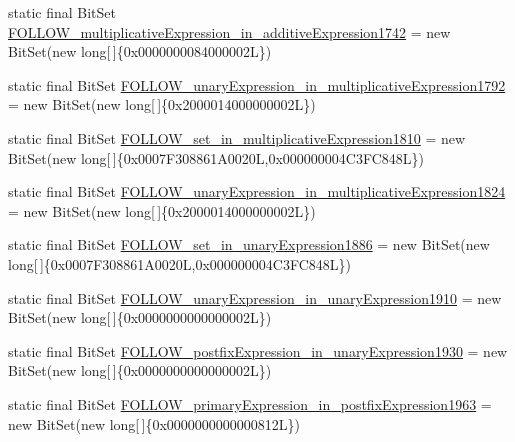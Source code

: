 \begin{DoxyCompactItemize}
\item 
static final Bit\-Set \hyperlink{classorg_1_1tzi_1_1use_1_1parser_1_1shell_1_1_shell_command_parser_afc497423bb8ad5b00ed5d5c4593c5d30}{F\-O\-L\-L\-O\-W\-\_\-multiplicative\-Expression\-\_\-in\-\_\-additive\-Expression1742} = new Bit\-Set(new long\mbox{[}$\,$\mbox{]}\{0x0000000084000002\-L\})
\item 
static final Bit\-Set \hyperlink{classorg_1_1tzi_1_1use_1_1parser_1_1shell_1_1_shell_command_parser_ac56334f9e533622073f94aa5b7e90cd4}{F\-O\-L\-L\-O\-W\-\_\-unary\-Expression\-\_\-in\-\_\-multiplicative\-Expression1792} = new Bit\-Set(new long\mbox{[}$\,$\mbox{]}\{0x2000014000000002\-L\})
\item 
static final Bit\-Set \hyperlink{classorg_1_1tzi_1_1use_1_1parser_1_1shell_1_1_shell_command_parser_a974a1b4dd61007a0cadacfffc5730efa}{F\-O\-L\-L\-O\-W\-\_\-set\-\_\-in\-\_\-multiplicative\-Expression1810} = new Bit\-Set(new long\mbox{[}$\,$\mbox{]}\{0x0007\-F308861\-A0020\-L,0x000000004\-C3\-F\-C848\-L\})
\item 
static final Bit\-Set \hyperlink{classorg_1_1tzi_1_1use_1_1parser_1_1shell_1_1_shell_command_parser_acdfca490e2653c7233faee3de2840437}{F\-O\-L\-L\-O\-W\-\_\-unary\-Expression\-\_\-in\-\_\-multiplicative\-Expression1824} = new Bit\-Set(new long\mbox{[}$\,$\mbox{]}\{0x2000014000000002\-L\})
\item 
static final Bit\-Set \hyperlink{classorg_1_1tzi_1_1use_1_1parser_1_1shell_1_1_shell_command_parser_ae3a39bf3fca69ad2fd3add8837b837df}{F\-O\-L\-L\-O\-W\-\_\-set\-\_\-in\-\_\-unary\-Expression1886} = new Bit\-Set(new long\mbox{[}$\,$\mbox{]}\{0x0007\-F308861\-A0020\-L,0x000000004\-C3\-F\-C848\-L\})
\item 
static final Bit\-Set \hyperlink{classorg_1_1tzi_1_1use_1_1parser_1_1shell_1_1_shell_command_parser_afd2110e0a7a7dd535f3e099d68b0be7a}{F\-O\-L\-L\-O\-W\-\_\-unary\-Expression\-\_\-in\-\_\-unary\-Expression1910} = new Bit\-Set(new long\mbox{[}$\,$\mbox{]}\{0x0000000000000002\-L\})
\item 
static final Bit\-Set \hyperlink{classorg_1_1tzi_1_1use_1_1parser_1_1shell_1_1_shell_command_parser_ad52974852b48c17b6bb449f7e35d8507}{F\-O\-L\-L\-O\-W\-\_\-postfix\-Expression\-\_\-in\-\_\-unary\-Expression1930} = new Bit\-Set(new long\mbox{[}$\,$\mbox{]}\{0x0000000000000002\-L\})
\item 
static final Bit\-Set \hyperlink{classorg_1_1tzi_1_1use_1_1parser_1_1shell_1_1_shell_command_parser_a1d4555593e087944b3deffed6a208d33}{F\-O\-L\-L\-O\-W\-\_\-primary\-Expression\-\_\-in\-\_\-postfix\-Expression1963} = new Bit\-Set(new long\mbox{[}$\,$\mbox{]}\{0x0000000000000812\-L\})

\end{DoxyCompactItemize}
